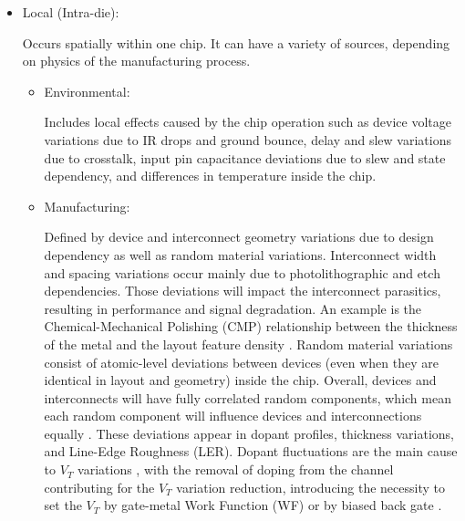 \documentclass[pgmicro,mestrado,english]{iiufrgs}
\begin{document}
\begin{itemize}
	\item Local (Intra-die):

	Occurs spatially within one chip. It can have a variety of sources, depending on physics of the manufacturing process.
		\begin{itemize}

		\item Environmental:

		Includes local effects caused by the chip operation such as device voltage variations due to IR drops and ground bounce, delay and slew variations due to crosstalk, input pin capacitance deviations due to slew and state dependency, and differences in temperature inside the chip.

		\item Manufacturing:

Defined by device and interconnect geometry variations due to design dependency as well as random material variations. Interconnect width and spacing variations occur mainly due to photolithographic and etch dependencies. Those deviations will impact the interconnect parasitics, resulting in performance and signal degradation. An example is the Chemical-Mechanical Polishing (CMP) relationship between the thickness of the metal and the layout feature density \cite{stine1997analysis}.  Random material variations consist of atomic-level deviations between devices (even when they are identical in layout and geometry) inside the chip. Overall, devices and interconnects will have fully correlated random components, which mean each random component will influence devices and interconnections equally \cite{dietrich2011process}. These deviations appear in dopant profiles, thickness variations, and Line-Edge Roughness (LER). Dopant fluctuations are the main cause to $V_T$ variations \cite{asenov2003simulation}, with the removal of doping from the channel contributing for the $V_T$ variation reduction, introducing the necessity to set the $V_T$ by gate-metal Work Function (WF) or by biased back gate \cite{frank2001device,wong1999nanoscale}.


\end{itemize}
\end{itemize}
\end{document}
